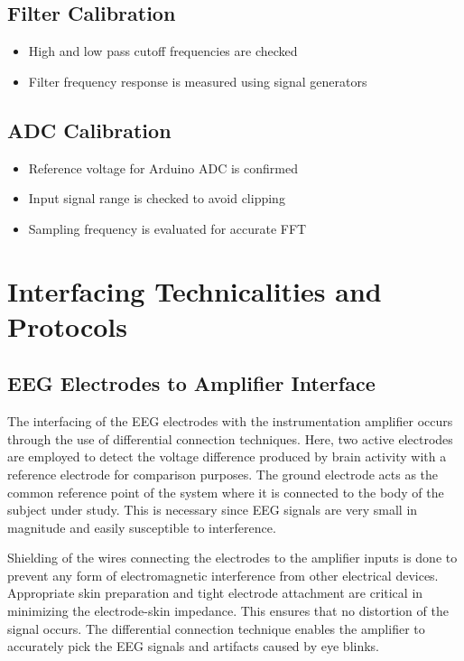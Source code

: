 \subsection{Filter Calibration}
\begin{itemize}
	\item High and low pass cutoff frequencies are checked
	\item Filter frequency response is measured using signal generators
\end{itemize}

\subsection{ADC Calibration}
\begin{itemize}
	\item Reference voltage for Arduino ADC is confirmed
	\item Input signal range is checked to avoid clipping
	\item Sampling frequency is evaluated for accurate FFT
\end{itemize}




\section{Interfacing Technicalities and Protocols}
\subsection{EEG Electrodes to Amplifier Interface}
The interfacing of the EEG electrodes with the instrumentation amplifier occurs through the use of differential connection techniques. Here, two active electrodes are employed to detect the voltage difference produced by brain activity with a reference electrode for comparison purposes. The ground electrode acts as the common reference point of the system where it is connected to the body of the subject under study. This is necessary since EEG signals are very small in magnitude and easily susceptible to interference.

Shielding of the wires connecting the electrodes to the amplifier inputs is done to prevent any form of electromagnetic interference from other electrical devices. Appropriate skin preparation and tight electrode attachment are critical in minimizing the electrode-skin impedance. This ensures that no distortion of the signal occurs. The differential connection technique enables the amplifier to accurately pick the EEG signals and artifacts caused by eye blinks.

